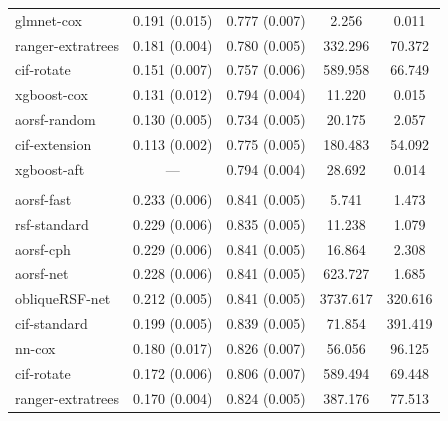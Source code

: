 \documentclass{article}\usepackage[]{graphicx}\usepackage[]{xcolor}
\newenvironment{knitrout}{}{} %
\begin{document}
\begin{knitrout}
\begin{longtable}[t]{lcccc}
\hspace{1em}glmnet-cox & 0.191 (0.015) & 0.777 (0.007) & 2.256 & 0.011\\
\hspace{1em}ranger-extratrees & 0.181 (0.004) & 0.780 (0.005) & 332.296 & 70.372\\
\hspace{1em}cif-rotate & 0.151 (0.007) & 0.757 (0.006) & 589.958 & 66.749\\
\hspace{1em}xgboost-cox & 0.131 (0.012) & 0.794 (0.004) & 11.220 & 0.015\\
\hspace{1em}aorsf-random & 0.130 (0.005) & 0.734 (0.005) & 20.175 & 2.057\\
\hspace{1em}cif-extension & 0.113 (0.002) & 0.775 (0.005) & 180.483 & 54.092\\
\hspace{1em}xgboost-aft & --- & 0.794 (0.004) & 28.692 & 0.014\\
\addlinespace[0.3em]
\multicolumn{5}{l}{\textit{\textbf{ARIC; heart failure, n = 13623, p = 41}}}\\
\hline
\hspace{1em}aorsf-fast & 0.233 (0.006) & 0.841 (0.005) & 5.741 & 1.473\\
\hspace{1em}rsf-standard & 0.229 (0.006) & 0.835 (0.005) & 11.238 & 1.079\\
\hspace{1em}aorsf-cph & 0.229 (0.006) & 0.841 (0.005) & 16.864 & 2.308\\
\hspace{1em}aorsf-net & 0.228 (0.006) & 0.841 (0.005) & 623.727 & 1.685\\
\hspace{1em}obliqueRSF-net & 0.212 (0.005) & 0.841 (0.005) & 3737.617 & 320.616\\
\hspace{1em}cif-standard & 0.199 (0.005) & 0.839 (0.005) & 71.854 & 391.419\\
\hspace{1em}nn-cox & 0.180 (0.017) & 0.826 (0.007) & 56.056 & 96.125\\
\hspace{1em}cif-rotate & 0.172 (0.006) & 0.806 (0.007) & 589.494 & 69.448\\
\hspace{1em}ranger-extratrees & 0.170 (0.004) & 0.824 (0.005) & 387.176 & 77.513\\

\end{longtable}
\end{knitrout}
\end{document}
